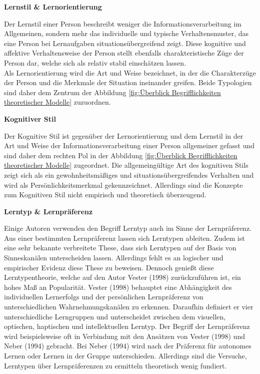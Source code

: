         \textbf{Lernstil \& Lernorientierung}

        Der Lernstil einer Person beschreibt weniger die Informationsverarbeitung im Allgemeinen, sondern mehr das individuelle und typische Verhaltensmuster, das eine Person bei Lernaufgaben situationsübergreifend zeigt.
        Diese kognitive und affektive Verhaltensweise der Person stellt ebenfalls charakteristische Züge der Person dar, welche sich als relativ stabil einschätzen lassen. \parencite[142]{Looss.2007}\parencite[58]{Groß.2017}\parencite[365]{Cress.2006} \\
        Als Lernorientierung wird die Art und Weise bezeichnet, in der die Charakterzüge der Person und die Merkmale der Situation ineinander greifen. \parencite[142]{Looss.2007}
        Beide Typologien sind daher dem Zentrum der Abbildung \ref{fig:Überblick Begrifflichkeiten theoretischer Modelle} zuzuordnen.

    
        \textbf{Kognitiver Stil}

        Der Kognitive Stil ist gegenüber der Lernorientierung und dem Lernstil in der Art und Weise der Informationsverarbeitung einer Person allgemeiner gefasst
        und sind daher dem rechten Pol in der Abbildung \ref{fig:Überblick Begrifflichkeiten theoretischer Modelle} zugeordnet. 
        Die allgemeingültige Art des kognitiven Stils zeigt sich als ein gewohnheitsmäßiges und situationsübergreifendes Verhalten und wird als Persönlichkeitsmerkmal gekennzeichnet.\parencite[365]{Cress.2006} 
        Allerdings sind die Konzepte zum Kognitiven Stil nicht empirisch und theoretisch überzeugend. \parencite[339]{tiedemann.2001}
        
        \textbf{Lerntyp \&  Lernpräferenz}

        Einige Autoren verwenden den Begriff Lerntyp auch im Sinne der Lernpräferenz. Aus einer bestimmten Lernpräferenz lassen sich Lerntypen ableiten. \parencite[372]{Cress.2006} 
        Zudem ist eine sehr bekannte verbreitete These, dass sich Lerntypen auf der Basis von Sinneskanälen unterscheiden lassen.
        Allerdings fehlt es an logischer und empirischer Evidenz diese These zu beweisen.
        Dennoch genießt diese Lerntypentheorie, welche auf den Autor Vester (1998) zurückzuführen ist, ein hohes Maß an Popularität. \parencite[144]{Looss.2007} \nocite{Vester.1998}
        Vester (1998) behauptet eine Abhängigkeit des individuellen Lernerfolgs und der persönlichen Lernpräferenz von unterschiedlichen Wahrnehmungskanälen zu erkennen. Daraufhin definiert er vier 
        unterschiedliche Lerngruppen und unterscheidet zwischen dem visuellen, optischen, haptischen und intellektuellen Lerntyp. \parencite[144]{Looss.2007} \parencite[17]{Schrader.2008} \parencite[372]{Cress.2006} 
        Der Begriff der Lernpräferenz wird beispielsweise oft in Verbindung mit den Ansätzen von Vester (1998) und Neber (1994) gebracht. Bei Neber (1994) wird nach der Präferenz für autonomes Lernen 
        oder Lernen in der Gruppe unterschieden. \nocite{Neber.1994}
        Allerdings sind die Versuche, Lerntypen über Lernpräferenzen zu ermitteln theoretisch wenig fundiert. \parencite[375]{Cress.2006}  
            
